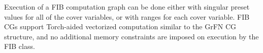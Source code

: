 Execution of a FIB computation graph can be done either with singular preset values for all of the cover variables, or with ranges for each cover variable.
FIB CGs support Torch-aided vectorized computation similar to the GrFN CG structure, and no additional memory constraints are imposed on execution by the FIB class.
